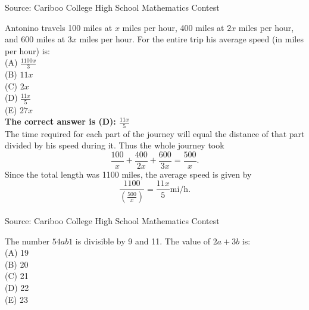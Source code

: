 \documentclass{article}
\begin{document}
\scriptsize
Source: Cariboo College High School Mathematics Contest

\normalsize
Antonino travels 100 miles at $x$ miles per hour, 400 miles at $2x$ miles per hour, and 600 miles at $3x$ miles per hour. For the entire trip his average speed (in miles per hour) is:\\
(A) $\frac{1100x}{3}$\\
(B) $11x$\\
(C) $2x$\\
(D) $\frac{11x}{5}$\\
(E) $27x$\\


\textbf{The correct answer is (D): $\frac{11x}{5}$}\\[1 ex]
The time required for each part of the journey will equal the distance of that part divided by his speed during it. Thus the whole journey took
\begin{equation*}
\frac{100}{x}+\frac{400}{2x}+\frac{600}{3x}=\frac{500}{x}.
\end{equation*}
Since the total length was 1100 miles, the average speed is given by
\begin{equation*}
\frac{1100}{(\frac{500}{x})}=\frac{11x}{5}\textrm{mi}/\textrm{h}.
\end{equation*}
\\[5 ex]

\scriptsize
Source: Cariboo College High School Mathematics Contest

\normalsize
The number $54ab1$ is divisible by 9 and 11. The value of $2a+3b$ is:\\
(A) 19\\
(B) 20\\
(C) 21\\
(D) 22\\
(E) 23\\
\end{document}
